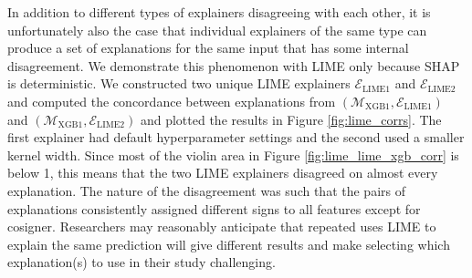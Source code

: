 \documentclass[mnsc,blindrev]{informs3}
\begin{document}
    
    
    In addition to different types of explainers disagreeing with each other, it is unfortunately also the case that individual explainers of the same type can produce a set of explanations for the same input that has some internal disagreement. We demonstrate this phenomenon with LIME only because SHAP is deterministic. %
               We constructed two unique LIME explainers $\mathcal{E}_{\text{LIME1}}$ and $\mathcal{E}_{\text{LIME2}}$ and computed the concordance between explanations from $(\mathcal{M}_{\text{XGB1}}, \mathcal{E}_{\text{LIME1}})$ and $(\mathcal{M}_{\text{XGB1}}, \mathcal{E}_{\text{LIME2}})$ and plotted the results in Figure \ref{fig:lime_corrs}. The first explainer had default hyperparameter settings and the second used a smaller kernel width. Since most of the violin area in Figure \ref{fig:lime_lime_xgb_corr} is below 1, this means that the two LIME explainers disagreed on almost every explanation. The nature of the disagreement was such that the pairs of explanations consistently assigned different signs to all features except for cosigner. Researchers may reasonably anticipate that repeated uses LIME to explain the same prediction will give different results and make selecting which explanation(s) to use in their study challenging. 
    
\end{document}

